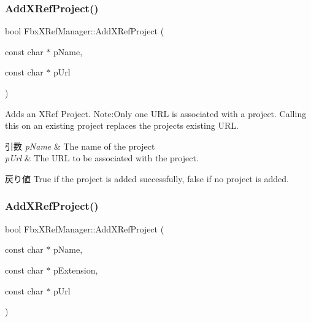 \subsubsection{\texorpdfstring{Add\+X\+Ref\+Project()}{AddXRefProject()}\hspace{0.1cm}{\footnotesize\ttfamily [1/3]}}
{\footnotesize\ttfamily bool Fbx\+X\+Ref\+Manager\+::\+Add\+X\+Ref\+Project (\begin{DoxyParamCaption}\item[{const char $\ast$}]{p\+Name,  }\item[{const char $\ast$}]{p\+Url }\end{DoxyParamCaption})}

Adds an X\+Ref Project. Note\+:Only one U\+RL is associated with a project. Calling this on an existing project replaces the project\textquotesingle{}s existing U\+RL. 
\begin{DoxyParams}{引数}
{\em p\+Name} & The name of the project \\
\hline
{\em p\+Url} & The U\+RL to be associated with the project. \\
\hline
\end{DoxyParams}
\begin{DoxyReturn}{戻り値}
{\ttfamily True} if the project is added successfully, {\ttfamily false} if no project is added. 
\end{DoxyReturn}
\mbox{\label{class_fbx_x_ref_manager_a34a0774a5a3e18c024339bb2ceca7488}} 
\subsubsection{\texorpdfstring{Add\+X\+Ref\+Project()}{AddXRefProject()}\hspace{0.1cm}{\footnotesize\ttfamily [2/3]}}
{\footnotesize\ttfamily bool Fbx\+X\+Ref\+Manager\+::\+Add\+X\+Ref\+Project (\begin{DoxyParamCaption}\item[{const char $\ast$}]{p\+Name,  }\item[{const char $\ast$}]{p\+Extension,  }\item[{const char $\ast$}]{p\+Url }\end{DoxyParamCaption})}

